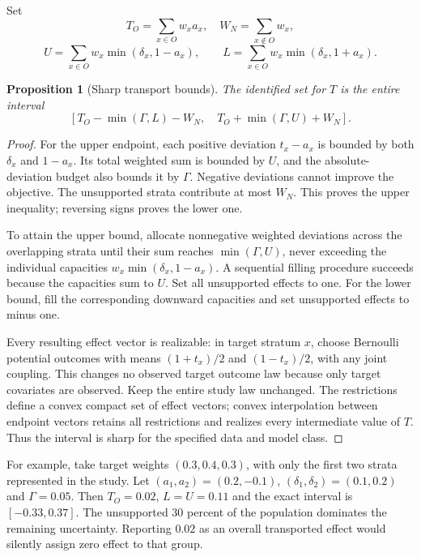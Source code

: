 \documentclass[11pt]{article}
\newtheorem{proposition}{Proposition}
\begin{document}
Set
\[
 T_O=\sum_{x\in O}w_xa_x,\quad W_N=\sum_{x\notin O}w_x,
\]
\[
 U=\sum_{x\in O}w_x\min(\delta_x,1-a_x),\qquad
 L=\sum_{x\in O}w_x\min(\delta_x,1+a_x).
\]
\begin{proposition}[Sharp transport bounds]
The identified set for $T$ is the entire interval
\[
 \left[T_O-\min(\Gamma,L)-W_N,\quad
       T_O+\min(\Gamma,U)+W_N\right].
\]
\end{proposition}
\begin{proof}
For the upper endpoint, each positive deviation $t_x-a_x$ is bounded by both $\delta_x$ and $1-a_x$. Its total weighted sum is bounded by $U$, and the absolute-deviation budget also bounds it by $\Gamma$. Negative deviations cannot improve the objective. The unsupported strata contribute at most $W_N$. This proves the upper inequality; reversing signs proves the lower one.

To attain the upper bound, allocate nonnegative weighted deviations across the overlapping strata until their sum reaches $\min(\Gamma,U)$, never exceeding the individual capacities $w_x\min(\delta_x,1-a_x)$. A sequential filling procedure succeeds because the capacities sum to $U$. Set all unsupported effects to one. For the lower bound, fill the corresponding downward capacities and set unsupported effects to minus one.

Every resulting effect vector is realizable: in target stratum $x$, choose Bernoulli potential outcomes with means $(1+t_x)/2$ and $(1-t_x)/2$, with any joint coupling. This changes no observed target outcome law because only target covariates are observed. Keep the entire study law unchanged. The restrictions define a convex compact set of effect vectors; convex interpolation between endpoint vectors retains all restrictions and realizes every intermediate value of $T$. Thus the interval is sharp for the specified data and model class.
\end{proof}

For example, take target weights $(0.3,0.4,0.3)$, with only the first two strata represented in the study. Let $(a_1,a_2)=(0.2,-0.1)$, $(\delta_1,\delta_2)=(0.1,0.2)$ and $\Gamma=0.05$. Then $T_O=0.02$, $L=U=0.11$ and the exact interval is $[-0.33,0.37]$. The unsupported 30 percent of the population dominates the remaining uncertainty. Reporting $0.02$ as an overall transported effect would silently assign zero effect to that group.
\end{document}
